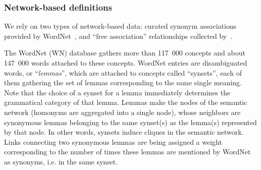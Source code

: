 \subsubsection{Network-based definitions}
We rely on two types of network-based data: curated synonym associations provided by WordNet~\citep{WordNet10}, and ``free association'' relationships collected by~\citet{Nelson04}.  

The WordNet (WN) database gathers more than 117~000 concepts and about 147~000 words attached to these concepts. WordNet entries are disambiguated words, or ``\emph{lemmas}'', which are attached to concepts called ``synsets'', each of them gathering the set of lemmas corresponding to the same single meaning. Note that the choice of a synset for a lemma immediately determines the grammatical category of that lemma. Lemmas make the nodes of the semantic network (homonyms are aggregated into a single node), whose neighbors are synonymous lemmas belonging to the same synset(s) as the lemma(s) represented by that node.  In other words, synsets induce cliques in the semantic network. Links connecting two synonymous lemmas are being assigned a weight corresponding to the number of times these lemmas are mentioned by WordNet as synonyms, i.e. in the same synset. 



